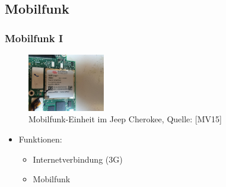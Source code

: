 \documentclass[t]{beamer}
\begin{document}
\subsection{Mobilfunk}
\begin{frame}
	\frametitle{Mobilfunk I}
    \begin{center}
        \begin{figure}
            \includegraphics[width=0.3\textwidth]{pic/001_cellular.jpg}
            \caption[Mobilfunk]{Mobilfunk-Einheit im Jeep Cherokee, Quelle: [MV15]}
        \end{figure}
	\end{center}

    \begin{itemize}
		\item Funktionen:
        \begin{itemize}
        	\item Internetverbindung (3G) %
            \item Mobilfunk %
        \end{itemize}
    \end{itemize}
\end{frame}
\end{document}
